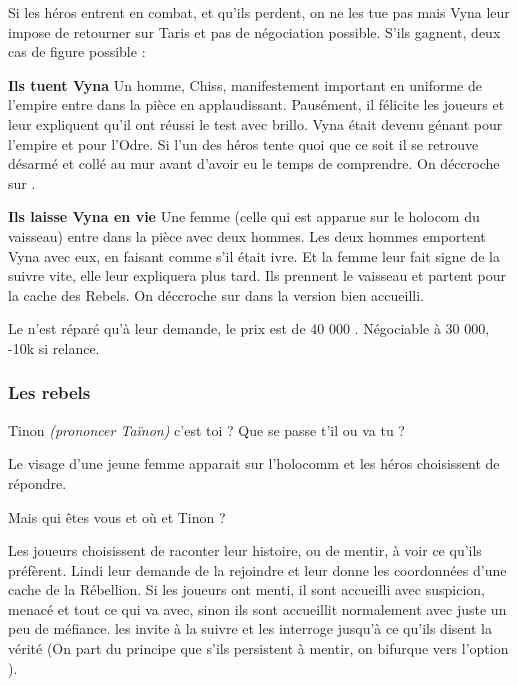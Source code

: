Si les héros entrent en combat, et qu'ils perdent, on ne les tue pas mais Vyna leur impose de retourner sur Taris et pas de négociation possible. S'ils gagnent, deux cas de figure possible :
\begin{rebelist}
    \item \textbf{Ils tuent Vyna} Un homme, Chiss, manifestement important en uniforme de l'empire entre dans la pièce en applaudissant. Pausément, il félicite les joueurs et   leur expliquent qu'il ont réussi le test avec brillo. Vyna était devenu génant pour l'empire et pour l'Odre. Si l'un des héros tente quoi que ce soit il se retrouve désarmé et collé au mur avant d'avoir eu le temps de comprendre. On déccroche sur .

    \item \textbf{Ils laisse Vyna en vie} Une femme (celle qui est apparue sur le holocom du vaisseau) entre dans la pièce avec deux hommes. Les deux hommes emportent Vyna avec eux, en faisant comme s'il était ivre. Et la femme leur fait signe de la suivre vite, elle leur expliquera plus tard. Ils prennent le vaisseau et partent pour la cache des Rebels. On déccroche sur  dans la version bien accueilli.
\end{rebelist}

Le  n'est réparé qu'à leur demande, le prix est de 40 000 \crg. Négociable à 30 000, -10k si relance.


\subsubsection{Les rebels} \label{sec:les-rebels}

\begin{quotebox}
    Tinon \emph{(prononcer Taïnon)} c’est toi ? Que se passe t’il ou va tu ?
\end{quotebox}

Le visage d’une jeune femme apparait sur l’holocomm et les héros choisissent de répondre.

\begin{quotebox}
    Mais qui êtes vous et où et Tinon ?
\end{quotebox}
Les joueurs choisissent de raconter leur histoire, ou de mentir, à voir ce qu'ils préfèrent. Lindi leur demande de la rejoindre et leur donne les coordonnées d'une cache de la Rébellion. Si les joueurs ont menti, il sont accueilli avec suspicion, menacé et tout ce qui va avec, sinon ils sont accueillit normalement avec juste un peu de méfiance.  les invite à la suivre et les interroge jusqu'à ce qu'ils disent la vérité (On part du principe que s'ils persistent à mentir, on bifurque vers l'option ).

